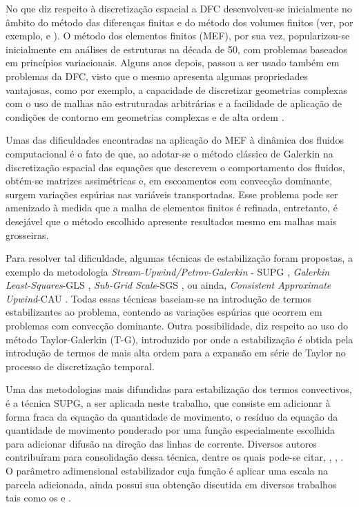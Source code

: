 \documentclass[tese_patricia.tex]{subfiles}
\begin{document}
No que diz respeito à discretização espacial a DFC desenvolveu-se inicialmente no âmbito do método das diferenças finitas e do método dos volumes finitos (ver, por exemplo,  e ). O método dos elementos finitos (MEF), por sua vez, popularizou-se inicialmente em análises de estruturas na década de 50, com problemas baseados em princípios variacionais. Alguns anos depois, passou a ser usado também em problemas da DFC, visto que o mesmo apresenta algumas propriedades vantajosas, como por exemplo, a capacidade de discretizar geometrias complexas com o uso de malhas não estruturadas arbitrárias e a facilidade de aplicação de condições de contorno em geometrias complexas e de alta ordem \cite{ZienkiewiczTN:2005,ReddyG:2000}.

Umas das dificuldades encontradas na aplicação do MEF à dinâmica dos fluidos computacional é o fato de que, ao adotar-se o método clássico de Galerkin na discretização espacial das equações que descrevem o comportamento dos fluidos, obtém-se matrizes assimétricas e, em escoamentos com convecção dominante, surgem variações espúrias nas variáveis transportadas. Esse problema pode ser amenizado à medida que a malha de elementos finitos é refinada, entretanto, é desejável que o método escolhido apresente resultados mesmo em malhas mais grosseiras.

Para resolver tal dificuldade, algumas técnicas de estabilização foram propostas, a exemplo da metodologia \textit{Stream-Upwind/Petrov-Galerkin} - SUPG \cite{BrooksH:1982}, \textit{Galerkin Least-Squares}-GLS \cite{HughesFH:1989} , \textit{Sub-Grid Scale}-SGS \cite{Hughes:1995}, ou ainda, \textit{Consistent Approximate Upwind}-CAU \cite{GaleaoC:1988}. Todas essas técnicas baseiam-se na introdução de termos estabilizantes ao problema, contendo as variações espúrias que ocorrem em problemas com convecção dominante. Outra possibilidade, diz respeito ao uso do método Taylor-Galerkin (T-G), introduzido por  onde a estabilização é obtida pela introdução de termos de mais alta ordem para a expansão em série de Taylor no processo de discretização temporal.

Uma das metodologias mais difundidas para estabilização dos termos convectivos, é a técnica SUPG, a ser aplicada neste trabalho, que consiste em adicionar à forma fraca da equação da quantidade de movimento, o resíduo da equação da quantidade de movimento ponderado por uma função especialmente escolhida para adicionar difusão na direção das linhas de corrente. Diversos autores contribuíram para consolidação dessa técnica, dentre os quais pode-se citar, , , . O parâmetro adimensional estabilizador cuja função é aplicar uma escala na parcela adicionada, ainda possui sua obtenção discutida em diversos trabalhos tais como os  e .
\end{document}
